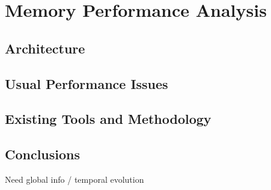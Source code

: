 \chapter{Memory Performance Analysis}

\section{Architecture}

\section{Usual Performance Issues}

\section{Existing Tools and Methodology}

\section{Conclusions}

Need global info / temporal evolution
